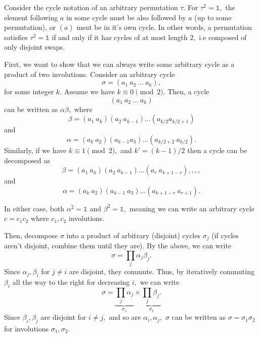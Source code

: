 \documentclass[12pt]{article}
\begin{document}
\begin{enumerate}
    Consider the cycle notation of an arbitrary permutation $\tau.$
    For $\tau^2 = \mathds{1},$ the element following $a$ in some
    cycle must be also followed by $a$ (up to some permutation), or
    $(a)$ msut be in it's own cycle. In other words, a permutation
    satisfies $\tau^2 = \mathds 1$ if and only if it has cycles of at
    most length $2,$ i.e composed of only disjoint swaps.

    First, we want to show that we can always write some arbitrary
    cycle as a product of two involutions. Consider an arbitrary cycle
    $$
    \sigma = (a_1 \ a_2 \ \ldots \ a_k),
    $$
    for some integer $k.$ Assume we have $k \equiv 0 \pmod 2.$ Then, a cycle
    $$
    (a_1 \ a_2 \ \ldots \ a_k)
    $$
    can be written as $\alpha \beta,$ where
    $$
    \beta = (a_1 \ a_k) (a_2 \ a_{k -1 }) \ldots (a_{k/2} a_{k/2 + 1})
    $$
    and
    $$
    \alpha = (a_k \ a_2) (a_{k - 1} a_3) \ldots (a_{k/2 + 2} \ a_{k/2}).
    $$
    Similarly, if we have $k \equiv 1 \pmod 2,$ and $k' = (k -1)/2$
    then a cycle can be decomposed as
    $$
    \beta = (a_1 \ a_k) (a_2 \ a_{k-1}) \ldots (a_r \ a_{k + 1 - r}),,,,
    $$
    and
    $$
    \alpha = (a_k \ a_2) (a_{k-1} \ a_3) \ldots (a_{k + 1- r} \ a_{r + 1}).
    $$

    In either case, both $\alpha^2 = \mathds 1$ and $\beta^2 =
    \mathds 1,$ meaning we can write an arbitrary cycle $c = c_1 c_2$
    where $c_1, c_2$ involutions.

    Then, decompose $\sigma$ into a product of arbitrary (disjoint)
    cycles $\sigma_j$ (if cycles aren't disjoint, combine them until
    they are). By the above, we can write
    $$
    \sigma = \prod_{j} \alpha_j \beta_j.
    $$
    Since $\alpha_j, \beta_i$ for $j \neq i$ are disjoint, they
    commute. Thus, by iteratively commuting $\beta_i$ all the way to
    the right for decreasing $i,$ we can write
    $$
    \sigma = \underbrace{\prod_{j} \alpha_j}_{\sigma_1} \times
    \underbrace{\prod_{j} \beta_j.}_{\sigma_2}
    $$
    Since $\beta_i, \beta_j$ are disjoint for $i \neq j,$ and so are
    $\alpha_i, \alpha_j,$ $\sigma$ can be written as $\sigma =
    \sigma_1 \sigma_2$ for involutions $\sigma_1, \sigma_2.$
\end{enumerate}
\end{document}
